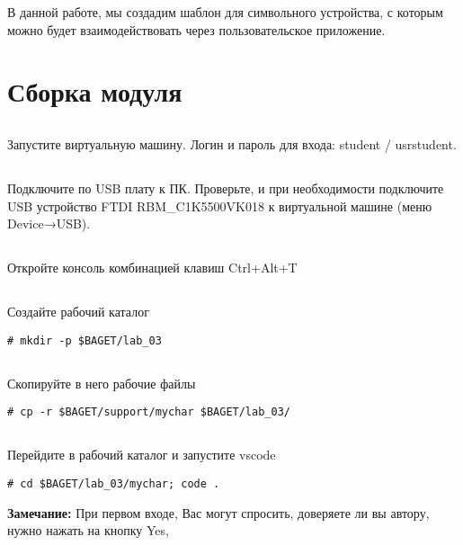 В данной работе, мы создадим шаблон для символьного устройства, с которым можно будет взаимодействовать через пользовательское приложение.

\section{Сборка модуля}

\subsection{}Запустите виртуальную машину. Логин и пароль для входа: student / usrstudent.

\subsection{}Подключите по USB плату к ПК. Проверьте, и при необходимости подключите USB устройство FTDI RBM\_C1K5500VK018 к виртуальной машине (меню Device→USB).

\subsection{}Откройте консоль комбинацией клавиш Ctrl+Alt+T

\subsection{}Создайте рабочий каталог
\begin{lstlisting}[style=bash]
# mkdir -p $BAGET/lab_03 
\end{lstlisting}

\subsection{}Скопируйте в него рабочие файлы
\begin{lstlisting}[style=bash]
# cp -r $BAGET/support/mychar $BAGET/lab_03/
\end{lstlisting}

\subsection{}Перейдите в рабочий каталог и запустите vscode
\begin{lstlisting}[style=bash]
# cd $BAGET/lab_03/mychar; code .
\end{lstlisting}

\textbf{Замечание:} При первом входе, Вас могут спросить, доверяете ли вы автору, нужно нажать на кнопку Yes,  

